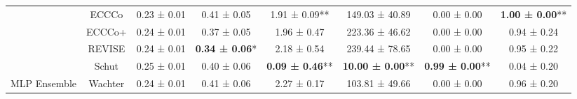 \begin{table}
{\begin{tabular}[t]{cccccccc}
 & ECCCo & 0.23 ± 0.01\hphantom{*}\hphantom{*} & 0.41 ± 0.05\hphantom{*}\hphantom{*} & 1.91 ± 0.09** & 149.03 ± 40.89\hphantom{*}\hphantom{*} & 0.00 ± 0.00\hphantom{*}\hphantom{*} & \textbf{1.00 ± 0.00}**\\

 & ECCCo+ & 0.24 ± 0.01\hphantom{*}\hphantom{*} & 0.37 ± 0.05\hphantom{*}\hphantom{*} & 1.96 ± 0.47\hphantom{*}\hphantom{*} & 223.36 ± 46.62\hphantom{*}\hphantom{*} & 0.00 ± 0.00\hphantom{*}\hphantom{*} & 0.94 ± 0.24\hphantom{*}\hphantom{*}\\

 & REVISE & 0.24 ± 0.01\hphantom{*}\hphantom{*} & \textbf{0.34 ± 0.06}*\hphantom{*} & 2.18 ± 0.54\hphantom{*}\hphantom{*} & 239.44 ± 78.65\hphantom{*}\hphantom{*} & 0.00 ± 0.00\hphantom{*}\hphantom{*} & 0.95 ± 0.22\hphantom{*}\hphantom{*}\\

 & Schut & 0.25 ± 0.01\hphantom{*}\hphantom{*} & 0.40 ± 0.06\hphantom{*}\hphantom{*} & \textbf{0.09 ± 0.46}** & \textbf{10.00 ± 0.00}** & \textbf{0.99 ± 0.00}** & 0.04 ± 0.20\hphantom{*}\hphantom{*}\\

\multirow[t]{-6}{*}{\centering\arraybackslash MLP Ensemble} & Wachter & 0.24 ± 0.01\hphantom{*}\hphantom{*} & 0.41 ± 0.06\hphantom{*}\hphantom{*} & 2.27 ± 0.17\hphantom{*}\hphantom{*} & 103.81 ± 49.66\hphantom{*}\hphantom{*} & 0.00 ± 0.00\hphantom{*}\hphantom{*} & 0.96 ± 0.20\hphantom{*}\hphantom{*}\\
\bottomrule
\end{tabular}}
\end{table}
